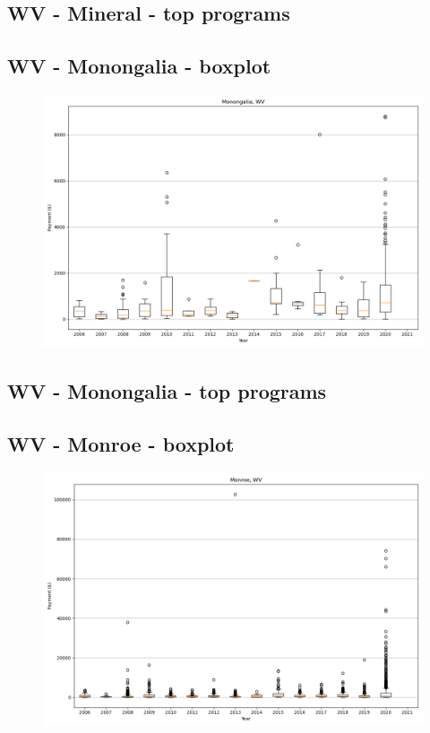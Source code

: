 \subsection*{WV - Mineral - top programs}

\newpage
\subsection*{WV - Monongalia - boxplot}
\begin{figure}[h]
\centering
\includegraphics[width=7in]{../output/boxplots/counties/Monongalia-WV_boxplot.png}
\end{figure}


\subsection*{WV - Monongalia - top programs}

\newpage
\subsection*{WV - Monroe - boxplot}
\begin{figure}[h]
\centering
\includegraphics[width=7in]{../output/boxplots/counties/Monroe-WV_boxplot.png}
\end{figure}


